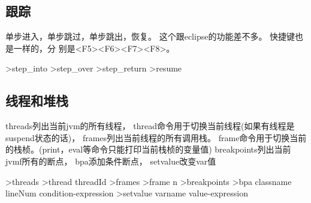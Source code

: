\documentclass[oneside,openany]{book}
\begin{document}
  \subsection{跟踪}

    单步进入，单步跳过，单步跳出，恢复。 这个跟eclipse的功能差不多。 快捷键也是一样的，分
    别是<F5><F6><F7><F8>。
    \begin{mdframed}[style=SmallFrame]
      \begin{flushleft}
      >step\_into\newline
      >step\_over\newline
      >step\_return\newline
      >resume           
      \end{flushleft}
    \end{mdframed}

    

  \subsection{线程和堆栈}
  threads列出当前jvm的所有线程， thread命令用于切换当前线程(如果有线程是suspend状态的话)，
  frames列出当前线程的所有调用栈。 frame命令用于切换当前的栈桢。(print，eval等命令只能打印当前栈桢的变量值)
  breakpoints列出当前jvmf所有的断点， bpa添加条件断点， setvalue改变var值
    \begin{mdframed}[style=SmallFrame]
      \begin{flushleft}
      >threads\newline
      >thread threadId\newline
      >frames\newline
      >frame n\newline
      >breakpoints\newline
      >bpa classname lineNum condition-expression\newline
      >setvalue  varname value-expression\newline
      \end{flushleft}
    \end{mdframed}
\end{document}
